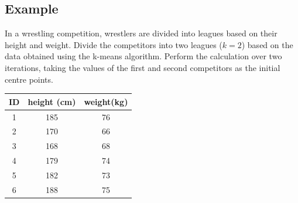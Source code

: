\documentclass[a4paper,12pt,answers]{article}
\begin{document}
	\subsection{Example}
	In a wrestling competition, wrestlers are divided into leagues based on their height and weight. Divide the competitors into two leagues ($k=2$) based on the data obtained using the k-means algorithm. Perform the calculation over two iterations, taking the values of the first and second competitors as the initial centre points.
	
	\begin{table}[H]
		\centering
		\begin{tabular}{|c|c|c|}
			\hline
			ID & height (cm) & weight(kg) \\ \hline \hline
			1 & 185 & 76 \\ \hline
			2 & 170 & 66 \\ \hline
			3 & 168 & 68 \\ \hline
			4 & 179 & 74 \\ \hline
			5 & 182 & 73 \\ \hline
			6 & 188 & 75 \\ \hline
		\end{tabular}
	\end{table}
	
\end{document}
